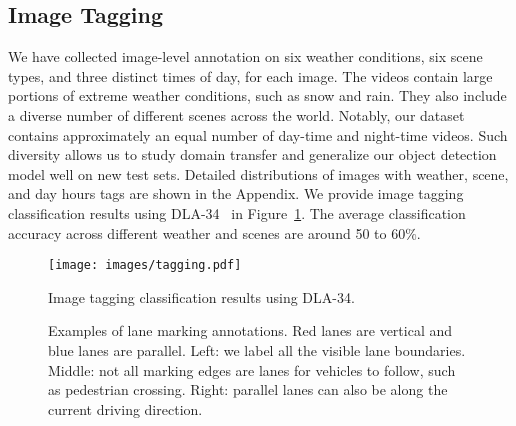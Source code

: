 \vspace{-1mm}
\subsection{Image Tagging}
\vspace{-1mm}
We have collected image-level annotation on six weather conditions, six scene types, and three distinct times of day, for each image. The videos contain large portions of extreme weather conditions, such as snow and rain. They also include a diverse number of different scenes across the world. Notably, our dataset contains approximately an equal number of day-time and night-time videos. Such diversity allows us to study domain transfer and generalize our object detection model well on new test sets. Detailed distributions of images with weather, scene, and day hours tags are shown in the Appendix. We provide image tagging classification results using DLA-34~\cite{dla} in Figure~\ref{fig:tagging}. The average classification accuracy across different weather and scenes are around 50 to 60$\%$.

\begin{figure}[h]
    \centering
    \texttt{[image: images/tagging.pdf]}
    \vspace{-5mm}
    \caption{\small Image tagging classification results using DLA-34.\vspace{-4mm}}
    \label{fig:tagging}
\end{figure}

\begin{figure*}[tp]
    \centering
    \caption{\small Examples of lane marking annotations. Red lanes are vertical and blue lanes are parallel. Left: we label all the visible lane boundaries. Middle: not all marking edges are lanes for vehicles to follow, such as pedestrian crossing. Right: parallel lanes can also be along the current driving direction.\vspace{-2mm}}
    \label{fig:lane_examples}
\end{figure*}

